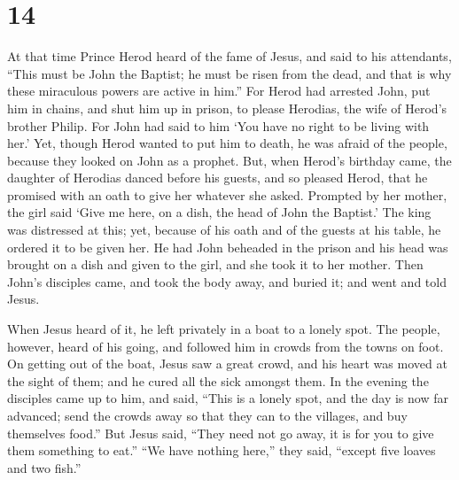 \hypertarget{section-13}{%
\section{14}\label{section-13}}

 At that time Prince Herod heard of the fame of Jesus,
 and said to his attendants, ``This must be John the
Baptist; he must be risen from the dead, and that is why these
miraculous powers are active in him.''  For Herod had
arrested John, put him in chains, and shut him up in prison, to please
Herodias, the wife of Herod's brother Philip.  For John had
said to him `You have no right to be living with her.'  Yet,
though Herod wanted to put him to death, he was afraid of the people,
because they looked on John as a prophet.  But, when Herod's
birthday came, the daughter of Herodias danced before his guests, and so
pleased Herod,  that he promised with an oath to give her
whatever she asked.  Prompted by her mother, the girl said
`Give me here, on a dish, the head of John the Baptist.' 
The king was distressed at this; yet, because of his oath and of the
guests at his table, he ordered it to be given her.  He had
John beheaded in the prison  and his head was brought on a
dish and given to the girl, and she took it to her mother. 
Then John's disciples came, and took the body away, and buried it; and
went and told Jesus.

 When Jesus heard of it, he left privately in a boat to a
lonely spot. The people, however, heard of his going, and followed him
in crowds from the towns on foot.  On getting out of the
boat, Jesus saw a great crowd, and his heart was moved at the sight of
them; and he cured all the sick amongst them.  In the
evening the disciples came up to him, and said, ``This is a lonely spot,
and the day is now far advanced; send the crowds away so that they can
to the villages, and buy themselves food.''  But Jesus
said, ``They need not go away, it is for you to give them something to
eat.''  ``We have nothing here,'' they said, ``except five
loaves and two fish.''

